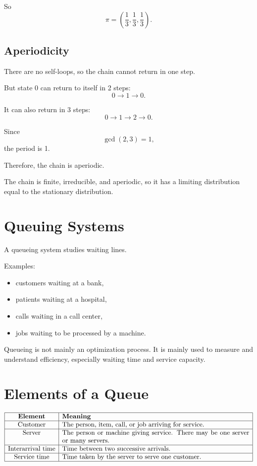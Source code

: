 \documentclass[12pt]{article}
\begin{document}
So
\[
\boxed{
\pi=\left(\frac13,\frac13,\frac13\right).
}
\]

\subsection*{Aperiodicity}

There are no self-loops, so the chain cannot return in one step.

But state 0 can return to itself in 2 steps:
\[
0\to 1\to 0.
\]

It can also return in 3 steps:
\[
0\to 1\to 2\to 0.
\]

Since
\[
\gcd(2,3)=1,
\]
the period is 1.

Therefore, the chain is aperiodic.

The chain is finite, irreducible, and aperiodic, so it has a limiting distribution equal to the stationary distribution.

\section{Queuing Systems}

A queueing system studies waiting lines.

Examples:
\begin{itemize}
    \item customers waiting at a bank,
    \item patients waiting at a hospital,
    \item calls waiting in a call center,
    \item jobs waiting to be processed by a machine.
\end{itemize}

Queueing is not mainly an optimization process. It is mainly used to measure and understand efficiency, especially waiting time and service capacity.

\section{Elements of a Queue}

\[
\begin{array}{|c|p{10cm}|}
\hline
\textbf{Element} & \textbf{Meaning}\\
\hline
\text{Customer} & The person, item, call, or job arriving for service.\\
\hline
\text{Server} & The person or machine giving service. There may be one server or many servers.\\
\hline
\text{Interarrival time} & Time between two successive arrivals.\\
\hline
\text{Service time} & Time taken by the server to serve one customer.\\
\hline
\end{array}
\]
\end{document}
